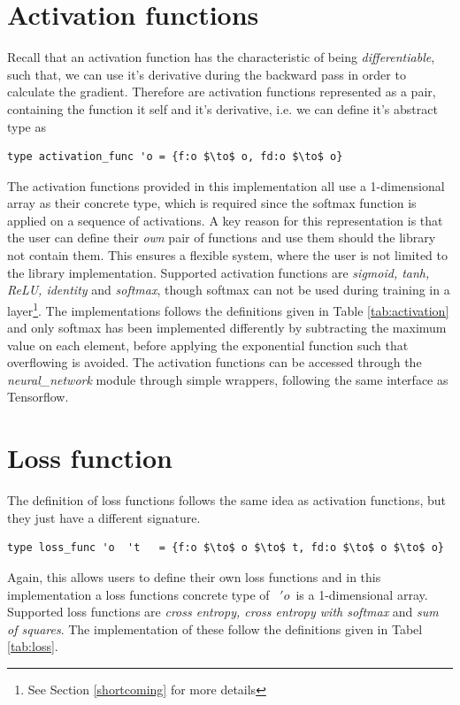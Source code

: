\section{Activation functions}
Recall that an activation function has the characteristic of being
\emph{differentiable}, such that, we can use it's derivative during the backward
pass in order to calculate the gradient. 
Therefore are activation functions represented as a pair, containing the
function it self and it's derivative, i.e. we can define it's abstract type as
\begin{lstlisting}[language=futhark, caption = {Abstract activation function
type}]
type activation_func 'o = {f:o $\to$ o, fd:o $\to$ o}
\end{lstlisting}
The activation functions provided in this implementation all use a 1-dimensional
array as their concrete type, which is required since the softmax function is
applied on a sequence of activations. 
A key reason for this representation is that the user can define their
\emph{own} pair of functions and use them should the library not contain them.
This ensures a flexible system, where the user is not limited to the library
implementation. 
Supported activation functions are \emph{sigmoid, tanh, ReLU, identity} and
\emph{softmax}, though softmax can not be used during training in a
layer\footnote{See Section \ref{shortcoming} for more details}. 
The implementations follows the definitions given in Table \ref{tab:activation}
and only softmax has been implemented differently by subtracting the maximum
value on each element, before applying the exponential function such that
overflowing is avoided. 
The activation functions can be accessed through the \emph{neural\_network}
module through simple wrappers, following the same interface as Tensorflow.
\section{Loss function}
The definition of loss functions follows the same idea as activation functions,
but they just have a different signature. 
\begin{lstlisting}[language=futhark, caption = {Abstract loss function type}]
type loss_func 'o  't   = {f:o $\to$ o $\to$ t, fd:o $\to$ o $\to$ o}
\end{lstlisting}
Again, this allows users to define their own loss functions and in this
implementation a loss functions concrete type of  \ $'o$\   is a 1-dimensional
array. 
Supported loss functions are \emph{cross entropy, cross entropy with softmax}
and \emph{sum of squares}. 
The implementation of these follow the definitions given in Tabel
\ref{tab:loss}. \newline 

